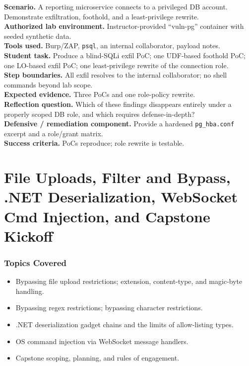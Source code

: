 \documentclass[11pt,letterpaper,oneside]{report}
\newcommand{\tool}[1]{\texttt{\small #1}}
\begin{document}
\begin{labbox}
\textbf{Scenario.} A reporting microservice connects to a privileged DB account. Demonstrate exfiltration, foothold, and a least-privilege rewrite.\\[3pt]
\textbf{Authorized lab environment.} Instructor-provided ``vuln-pg'' container with seeded synthetic data.\\[3pt]
\textbf{Tools used.} Burp/ZAP, \tool{psql}, an internal collaborator, payload notes.\\[3pt]
\textbf{Student task.} Produce a blind-SQLi exfil PoC; one UDF-based foothold PoC; one LO-based exfil PoC; one least-privilege rewrite of the connection role.\\[3pt]
\textbf{Step boundaries.} All exfil resolves to the internal collaborator; no shell commands beyond lab scope.\\[3pt]
\textbf{Expected evidence.} Three PoCs and one role-policy rewrite.\\[3pt]
\textbf{Reflection question.} Which of these findings disappears entirely under a properly scoped DB role, and which requires defense-in-depth?\\[3pt]
\textbf{Defensive / remediation component.} Provide a hardened \tool{pg\_hba.conf} excerpt and a role/grant matrix.\\[3pt]
\textbf{Success criteria.} PoCs reproduce; role rewrite is testable.
\end{labbox}

\chapter{File Uploads, Filter and Bypass, .NET Deserialization, WebSocket Cmd Injection, and Capstone Kickoff}

\subsection*{Topics Covered}
\begin{itemize}
  \item Bypassing file upload restrictions; extension, content-type, and magic-byte handling.
  \item Bypassing regex restrictions; bypassing character restrictions.
  \item .NET deserialization gadget chains and the limits of allow-listing types.
  \item OS command injection via WebSocket message handlers.
  \item Capstone scoping, planning, and rules of engagement.
\end{itemize}
\end{document}
